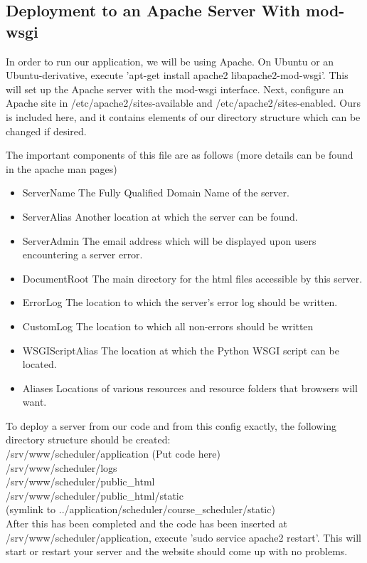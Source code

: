 \documentclass[pdftex,12pt,letter]{article}
\begin{document}
\subsection{Deployment to an Apache Server With mod-wsgi}
In order to run our application, we will be using Apache. On Ubuntu or an Ubuntu-derivative, execute 'apt-get install apache2 libapache2-mod-wsgi'. This will set up the Apache server with the mod-wsgi interface. Next, configure an Apache site in /etc/apache2/sites-available and /etc/apache2/sites-enabled. Ours is included here, and it contains elements of our directory structure which can be changed if desired.

The important components of this file are as follows (more details can be found in the apache man pages)
\begin{itemize}
\item ServerName
\subitem The Fully Qualified Domain Name of the server.
\item ServerAlias
\subitem Another location at which the server can be found.
\item ServerAdmin
\subitem The email address which will be displayed upon users encountering a server error.
\item DocumentRoot
\subitem The main directory for the html files accessible by this server.
\item ErrorLog
\subitem The location to which the server's error log should be written.
\item CustomLog
\subitem The location to which all non-errors should be written
\item WSGIScriptAlias
\subitem The location at which the Python WSGI script can be located.
\item Aliases
\subitem Locations of various resources and resource folders that browsers will want.
\end{itemize}
To deploy a server from our code and from this config exactly, the following directory structure should be created:\\
/srv/www/scheduler/application (Put code here)\\
/srv/www/scheduler/logs\\
/srv/www/scheduler/public\_html\\
/srv/www/scheduler/public\_html/static\\
(symlink to ../application/scheduler/course\_scheduler/static)\\
After this has been completed and the code has been inserted at /srv/www/scheduler/application, execute 'sudo service apache2 restart'. This will start or restart your server and the website should come up with no problems.
\end{document}
